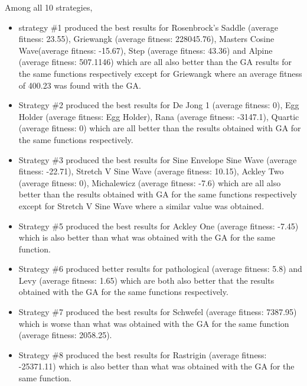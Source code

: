 \documentclass[12pt]{article}
\begin{document}
					Among all 10 strategies, 
					\begin{itemize}
						\item strategy \#1 produced the best results for Rosenbrock's Saddle (average fitness: 23.55), Griewangk (average fitness: 228045.76), Masters Cosine Wave(average fitness: -15.67), Step (average fitness: 43.36) and Alpine (average fitness: 507.1146) which are all also better than the GA results for the same functions respectively except for Griewangk where an average fitness of 400.23 was found with the GA. 
					
						\item Strategy \#2 produced the best results for De Jong 1 (average fitness: 0), Egg Holder (average fitness: Egg Holder), Rana (average fitness: -3147.1), Quartic (average fitness: 0) which are all better than the results obtained with GA for the same functions respectively.
					
						\item Strategy \#3 produced the best results for Sine Envelope Sine Wave (average fitness: -22.71), Stretch V Sine Wave (average fitness: 10.15), Ackley Two (average fitness: 0), Michalewicz (average fitness: -7.6) which are all also better than the results obtained with GA for the same functions respectively except for Stretch V Sine Wave where a similar value was obtained.
						
						\item Strategy \#5 produced the best results for Ackley One (average fitness: -7.45) which is also better than what was obtained with the GA for the same function.
						
						\item Strategy \#6 produced better results for pathological (average fitness: 5.8) and Levy (average fitness: 1.65) which are both also better that the results obtained with the GA for the same functions respectively.
						
						\item Strategy \#7 produced the best results for Schwefel (average fitness: 7387.95) which is worse than what was obtained with the GA for the same function (average fitness: 2058.25).
						
						\item Strategy \#8 produced the best results for Rastrigin (average fitness: -25371.11) which is also better than what was obtained with the GA for the same function.
					\end{itemize}
					
\end{document}
